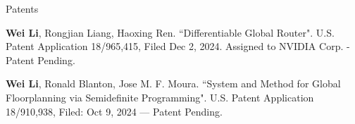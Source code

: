 \newpage

\begin{rSection}{Patents}


    \begin{description}[font=\normalfont]
        \item[{[P2]}]{
            \textbf{Wei Li}, Rongjian Liang, Haoxing Ren. ``Differentiable Global Router".
            U.S. Patent Application 18/965,415, Filed Dec 2, 2024.
            Assigned to NVIDIA Corp. - Patent Pending.
        }
        \item[{[P1]}]{
            \textbf{Wei Li}, Ronald Blanton, Jose M. F. Moura. ``System and Method for Global Floorplanning via Semidefinite Programming". U.S. Patent Application 18/910,938, Filed: Oct 9, 2024 — Patent Pending.
        }
    \end{description}

\end{rSection}



